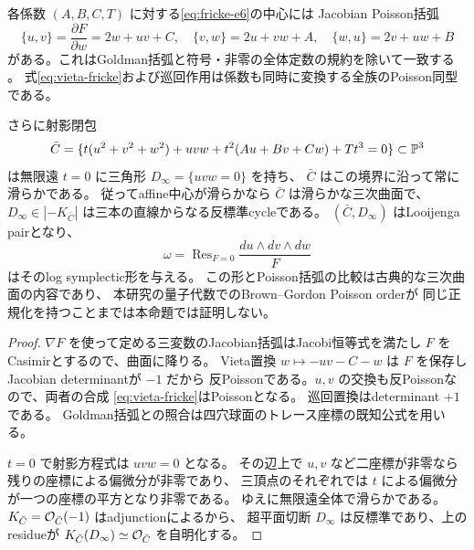 \begin{proposition}
\label{prop:fricke-poisson-logcy}
各係数 $(A,B,C,T)$ に対する\eqref{eq:fricke-e6}の中心には
Jacobian Poisson括弧
\[
 \{u,v\}=\frac{\partial F}{\partial w}=2w+uv+C,\quad
 \{v,w\}=2u+vw+A,\quad
 \{w,u\}=2v+uw+B
\]
がある。これはGoldman括弧と符号・非零の全体定数の規約を除いて一致する
\cite{GoldmanTrace,HikamiCluster}。
式\eqref{eq:vieta-fricke}および巡回作用は係数も同時に変換する全族のPoisson同型である。

さらに射影閉包
\[
 \bar C=\{t(u^2+v^2+w^2)+uvw+t^2(Au+Bv+Cw)+Tt^3=0\}\subset\mathbb P^3
\]
は無限遠 $t=0$ に三角形 $D_\infty=\{uvw=0\}$ を持ち、
$\bar C$ はこの境界に沿って常に滑らかである。
従ってaffine中心が滑らかなら $\bar C$ は滑らかな三次曲面で、
$D_\infty\in|-K_{\bar C}|$ は三本の直線からなる反標準cycleである。
$(\bar C,D_\infty)$ はLooijenga pairとなり、
\[
 \omega=\operatorname{Res}_{F=0}\frac{du\wedge dv\wedge dw}{F}
\]
はそのlog symplectic形を与える。
この形とPoisson括弧の比較は古典的な三次曲面の内容であり、
本研究の量子代数でのBrown--Gordon Poisson orderが
同じ正規化を持つことまでは本命題では証明しない。
\end{proposition}
\begin{proof}
$\nabla F$ を使って定める三変数のJacobian括弧はJacobi恒等式を満たし
$F$ をCasimirとするので、曲面に降りる。
Vieta置換 $w\mapsto-uv-C-w$ は $F$ を保存しJacobian determinantが $-1$ だから
反Poissonである。$u,v$ の交換も反Poissonなので、両者の合成
\eqref{eq:vieta-fricke}はPoissonとなる。
巡回置換はdeterminant $+1$ である。
Goldman括弧との照合は四穴球面のトレース座標の既知公式を用いる。

$t=0$ で射影方程式は $uvw=0$ となる。
その辺上で $u,v$ など二座標が非零なら残りの座標による偏微分が非零であり、
三頂点のそれぞれでは $t$ による偏微分が一つの座標の平方となり非零である。
ゆえに無限遠全体で滑らかである。
$K_{\bar C}=\mathcal O_{\bar C}(-1)$ はadjunctionによるから、
超平面切断 $D_\infty$ は反標準であり、上のresidueが
$K_{\bar C}(D_\infty)\simeq\mathcal O_{\bar C}$ を自明化する。
\end{proof}

